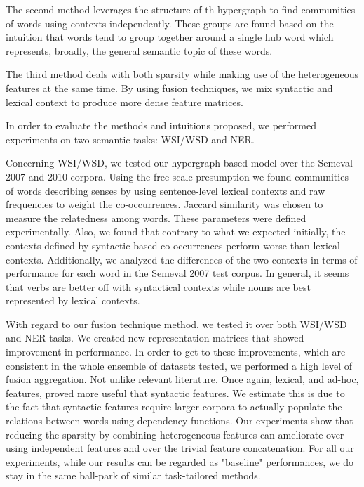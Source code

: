 The second method leverages the structure of th hypergraph to find communities of words using contexts independently. These groups are found based on the intuition that words tend to group together around a single hub word which represents, broadly, the general semantic topic of these words.

The third method deals with both sparsity while making use of the heterogeneous features at the same time. By using fusion techniques, we mix syntactic and lexical context to produce more dense feature matrices.

In order to evaluate the methods and intuitions proposed, we performed experiments on two semantic tasks: WSI/WSD and NER.

Concerning WSI/WSD, we tested our hypergraph-based model over the Semeval 2007 and 2010 corpora. Using the free-scale presumption we found communities of words describing senses by using sentence-level lexical contexts and raw frequencies to weight the co-occurrences. Jaccard similarity was chosen to measure the relatedness among words. These parameters were defined experimentally. Also, we found that contrary to what we expected initially, the contexts defined by syntactic-based co-occurrences perform worse than lexical contexts. Additionally, we analyzed the differences of the two contexts in terms of performance for each word in the Semeval 2007 test corpus. In general, it seems that verbs are better off with syntactical contexts while nouns are best represented by lexical contexts.

With regard to our fusion technique method, we tested it over both WSI/WSD and NER tasks. We created new representation matrices that showed improvement in performance. In order to get to these improvements, which are consistent in the whole ensemble of datasets tested, we performed a high level of fusion aggregation. Not unlike relevant literature. Once again, lexical, and ad-hoc, features, proved more useful that syntactic features. We estimate this is due to the fact that syntactic features require larger corpora to actually populate the relations between words using dependency functions. Our experiments show that reducing the sparsity by combining heterogeneous features can ameliorate over using independent features and over the trivial feature concatenation. For all our experiments, while our results can be regarded as "baseline" performances, we do stay in the same ball-park of similar task-tailored methods.





